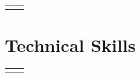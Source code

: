 \documentclass[
	10pt, %
	]{FreemanCV}
\begin{document}
\begin{paracol}{2}
\begin{supertabular}{r l}
	
	
\end{supertabular}

\medskip %


\section{Technical Skills} 




\begin{supertabular}{r l}
\begin{barchart}{5.5}
\end{barchart} \\
\end{supertabular}


\switchcolumn %



\end{paracol}
\end{document}
